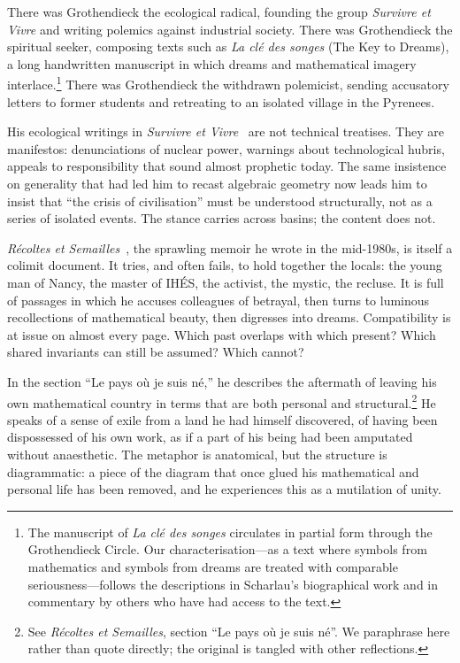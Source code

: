 There was Grothendieck the ecological radical, founding the group \emph{Survivre et Vivre} and writing polemics against industrial society. There was Grothendieck the spiritual seeker, composing texts such as \emph{La cl\'e des songes} (The Key to Dreams), a long handwritten manuscript in which dreams and mathematical imagery interlace.\footnote{The manuscript of \emph{La cl\'e des songes} circulates in partial form through the Grothendieck Circle. Our characterisation---as a text where symbols from mathematics and symbols from dreams are treated with comparable seriousness---follows the descriptions in Scharlau's biographical work and in commentary by others who have had access to the text.} There was Grothendieck the withdrawn polemicist, sending accusatory letters to former students and retreating to an isolated village in the Pyrenees.

His ecological writings in \emph{Survivre et Vivre}~\cite{survivre} are not technical treatises. They are manifestos: denunciations of nuclear power, warnings about technological hubris, appeals to responsibility that sound almost prophetic today. The same insistence on generality that had led him to recast algebraic geometry now leads him to insist that ``the crisis of civilisation'' must be understood structurally, not as a series of isolated events. The stance carries across basins; the content does not.

\emph{R\'ecoltes et Semailles}~\cite{grothendieck_res}, the sprawling memoir he wrote in the mid-1980s, is itself a colimit document. It tries, and often fails, to hold together the locals: the young man of Nancy, the master of IH\'ES, the activist, the mystic, the recluse. It is full of passages in which he accuses colleagues of betrayal, then turns to luminous recollections of mathematical beauty, then digresses into dreams. Compatibility is at issue on almost every page. Which past overlaps with which present? Which shared invariants can still be assumed? Which cannot?

In the section ``Le pays o\`u je suis n\'e,'' he describes the aftermath of leaving his own mathematical country in terms that are both personal and structural.\footnote{See \emph{R\'ecoltes et Semailles}, section ``Le pays o\`u je suis n\'e''. We paraphrase here rather than quote directly; the original is tangled with other reflections.} He speaks of a sense of exile from a land he had himself discovered, of having been dispossessed of his own work, as if a part of his being had been amputated without anaesthetic. The metaphor is anatomical, but the structure is diagrammatic: a piece of the diagram that once glued his mathematical and personal life has been removed, and he experiences this as a mutilation of unity.

